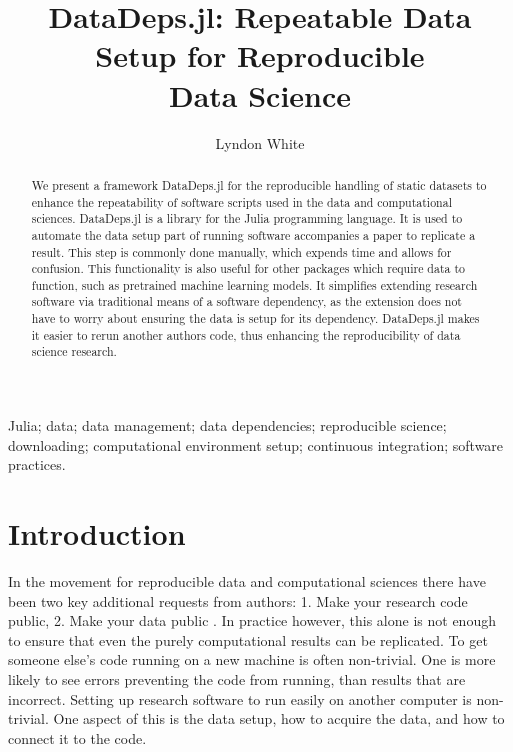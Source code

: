 \documentclass[twoside,11pt]{article}
\begin{document}
\title{DataDeps.jl: Repeatable Data Setup for Reproducible\\ Data Science}
\author{Lyndon White}
\editor{}


\maketitle

\begin{abstract}
	We present a framework DataDeps.jl for the reproducible handling of static datasets to enhance the repeatability of software scripts used in the data and computational sciences.
	DataDeps.jl is a library for the Julia programming language.
	It is used to automate the data setup part of running software accompanies a paper to replicate a result.
	This step is commonly done manually, which expends time and allows for confusion.
	This functionality is also useful for other packages which require data to function, such as pretrained machine learning models.
	It simplifies extending research software via traditional means of a software dependency, as the extension does not have to worry about ensuring the data is setup for its dependency.
	DataDeps.jl makes it easier to rerun another authors code, thus enhancing the reproducibility of data science research.
\end{abstract}

\begin{keywords}
Julia; data; data management;  data dependencies; reproducible science; downloading; computational environment setup; continuous integration; software practices.
\end{keywords}

\section{Introduction}

In the movement for reproducible data and computational sciences there have been two key additional requests from authors:
1. Make your research code public, 2. Make your data public \citep{lookafterdata}.
In practice however, this alone is not enough to ensure that even the purely computational results can be replicated.
To get someone else's code running on a new machine is often non-trivial.
One is more likely to see errors preventing the code from running, than results that are incorrect.
Setting up research software to run easily on another computer is non-trivial.
One aspect of this is the data setup, how to acquire the data, and how to connect it to the code.
\end{document}
